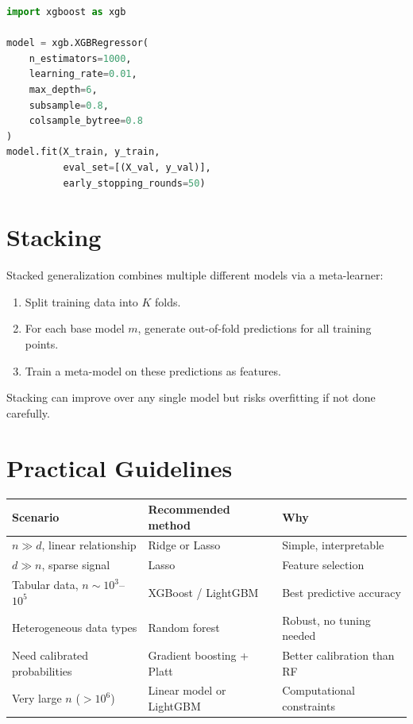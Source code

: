 \begin{lstlisting}[language=Python, caption=XGBoost]
import xgboost as xgb

model = xgb.XGBRegressor(
    n_estimators=1000,
    learning_rate=0.01,
    max_depth=6,
    subsample=0.8,
    colsample_bytree=0.8
)
model.fit(X_train, y_train,
          eval_set=[(X_val, y_val)],
          early_stopping_rounds=50)
\end{lstlisting}

\section{Stacking}

Stacked generalization combines multiple different models via a meta-learner:

\begin{enumerate}
	\item Split training data into $K$ folds.
	\item For each base model $m$, generate out-of-fold predictions for all training points.
	\item Train a meta-model on these predictions as features.
\end{enumerate}

Stacking can improve over any single model but risks overfitting if not done carefully.

\section{Practical Guidelines}

\begin{longtable}{p{3cm}p{5cm}p{5cm}}
	\toprule
	\textbf{Scenario}                   & \textbf{Recommended method} & \textbf{Why}               \\
	\midrule
	$n \gg d$, linear relationship      & Ridge or Lasso              & Simple, interpretable      \\
	$d \gg n$, sparse signal            & Lasso                       & Feature selection          \\
	Tabular data, $n \sim 10^3$--$10^5$ & XGBoost / LightGBM          & Best predictive accuracy   \\
	Heterogeneous data types            & Random forest               & Robust, no tuning needed   \\
	Need calibrated probabilities       & Gradient boosting + Platt   & Better calibration than RF \\
	Very large $n$ ($>10^6$)            & Linear model or LightGBM    & Computational constraints  \\
	\bottomrule
\end{longtable}

